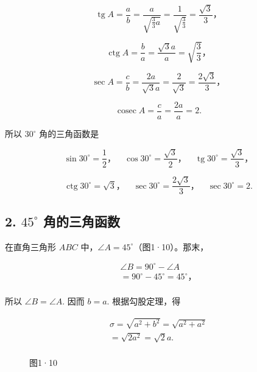 \[
\operatorname{tg} A = \frac {a}{b} = \frac {a}{\sqrt {\frac {3}{3} a}} = \frac {1}{\sqrt {\frac {3}{3}}} = \frac {\sqrt {3}}{3}\text{，}
\]

\[
\operatorname{ctg} A = \frac {b}{a} = \frac {\sqrt {3} a}{a} = \sqrt {\frac {3}{3}}\text{，}
\]

\[
\sec A = \frac {c}{b} = \frac {2 a}{\sqrt {3} a} = \frac {2}{\sqrt {3}} = \frac {2 \sqrt {3}}{3}\text{，}
\]

\[
\operatorname{cosec}A=\frac{c}{a}=\frac{2a}{a}=2.
\]

所以 \(30^{\circ}\) 角的三角函数是

\[
\sin 30 ^{\circ} = \frac {1}{2}\text{，} \quad \cos 30 ^{\circ} = \frac {\sqrt {3}}{2}\text{，} \quad \operatorname{tg} 30 ^{\circ} = \frac {\sqrt {3}}{3}\text{，}
\]

\[
\operatorname{ctg} 30 ^{\circ} = \sqrt {3}\text{，} \quad \sec 30 ^{\circ} = \frac {2 \sqrt {3}}{3}\text{，} \quad \sec 30 ^{\circ} = 2.
\]

\subsection{\texorpdfstring{2. \(45^{\circ}\) 角的三角函数}{2. 45\^{}\{\textbackslash circ\} 角的三角函数}}\label{circ-ux89d2ux7684ux4e09ux89d2ux51fdux6570}

在直角三角形 \(ABC\) 中，\(\angle A = 45^{\circ}\)（图1·10）。那末，

\[
\begin{array}{l} \angle B = 90 ^{\circ} - \angle A \\ = 90 ^{\circ} - 45 ^{\circ} = 45 ^{\circ}\text{，} \\ \end{array}
\]

所以 \(\angle B = \angle A.\) 因而 \(b = a.\) 根据勾股定理，得

\[
\begin{array}{l} \sigma = \sqrt {a ^ {2} + b ^ {2}} = \sqrt {a ^ {2} + a ^ {2}} \\ = \sqrt {2 a ^ {2}} = \sqrt {2} a. \\ \end{array}
\]

\begin{figure}
\centering
{}
\caption{图1·10}
\end{figure}


